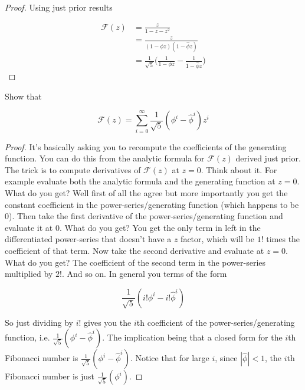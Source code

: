 \documentclass[12pt]{article}
\begin{document}
\begin{proof}
Using just prior results 

\begin{align*}
\mathcal{F}(z) &= \frac{z}{1-z-z^2} \\
&= \frac{z}{(1-\phi z)(1-\hat{\phi}z)} \\
&=  \frac{1}{\sqrt{5}}\bigg(\frac{1}{1-\phi z}-\frac{1}{1-\hat{\phi}z}\bigg)
\end{align*}
\end{proof}

Show that 

$$
\mathcal{F}(z) = \sum_{i=0}^\infty \frac{1}{\sqrt{5}}(\phi^i - \hat{\phi}^i)z^i
$$

\begin{proof}
It's basically asking you to recompute the coefficients of the generating function. You can do this from the analytic formula for $\mathcal{F}(z)$ derived just prior.
The trick is to compute derivatives of $\mathcal{F}(z)$ at $z=0$. Think about it. For example evaluate both the analytic formula and the generating function at $z=0$.
What do you get? Well first of all the agree but more importantly you get the constant coefficient in the power-series/generating function (which happens to be $0$).
Then take the first derivative of the power-series/generating function and evaluate it at 0. What do you get? You get the only term in left in the differentiated power-series
that doesn't have a $z$ factor, which will be $1!$ times the coefficient of that term. Now take the second derivative and evaluate at $z=0$. What do you get? The coefficient
of the second term in the power-series multiplied by $2!$. And so on. In general you terms of the form

$$
\frac{1}{\sqrt{5}}(i!\phi^i-i!\hat{\phi}^i)
$$

So just dividing by $i!$ gives you the $i$th coefficient of the power-series/generating function, i.e. $\frac{1}{\sqrt{5}}(\phi^i-\hat{\phi}^i)$.
The implication being that a closed form for the $i$th Fibonacci number is $\frac{1}{\sqrt{5}}(\phi^i-\hat{\phi}^i)$. 
Notice that for large $i$, since $|\hat{\phi}| < 1$, the $i$th Fibonacci number is just $\frac{1}{\sqrt{5}}(\phi^i)$. 

\end{proof}
\end{document}
